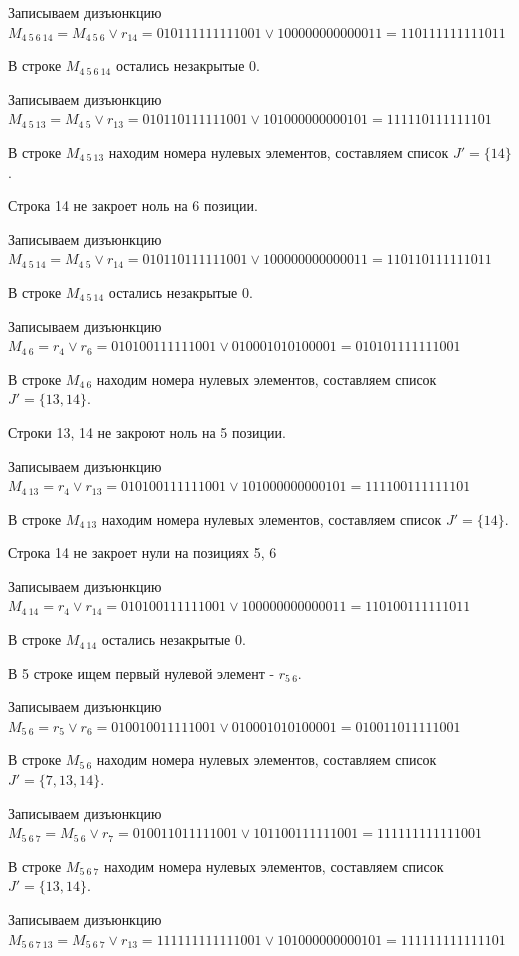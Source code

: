 \documentclass{article}
\begin{document}
Записываем дизъюнкцию $M_{4\ 5\ 6\ 14} = M_{4\ 5\ 6}\lor r_{14} = 010111111111001 \lor 100000000000011 = 110111111111011$

В строке $M_{4\ 5\ 6\ 14}$ остались незакрытые 0.

Записываем дизъюнкцию $M_{4\ 5\ 13} = M_{4\ 5}\lor r_{13} = 010110111111001 \lor 101000000000101 = 111110111111101$

В строке $M_{4\ 5\ 13}$ находим номера нулевых элементов, составляем список $J' = \{14\}$.

Строка 14 не закроет ноль на 6 позиции.

Записываем дизъюнкцию $M_{4\ 5\ 14} = M_{4\ 5}\lor r_{14} = 010110111111001 \lor 100000000000011 = 110110111111011$

В строке $M_{4\ 5\ 14}$ остались незакрытые 0.

Записываем дизъюнкцию $M_{4\ 6} = r_{4}\lor r_{6} = 010100111111001 \lor 010001010100001 = 010101111111001$

В строке $M_{4\ 6}$ находим номера нулевых элементов, составляем список $J' = \{13, 14\}$.

Строки 13, 14 не закроют ноль на 5 позиции.

Записываем дизъюнкцию $M_{4\ 13} = r_{4}\lor r_{13} = 010100111111001 \lor 101000000000101 = 111100111111101$

В строке $M_{4\ 13}$ находим номера нулевых элементов, составляем список $J' = \{14\}$.

Строка 14 не закроет нули на позициях 5, 6

Записываем дизъюнкцию $M_{4\ 14} = r_{4}\lor r_{14} = 010100111111001 \lor 100000000000011 = 110100111111011$

В строке $M_{4\ 14}$ остались незакрытые 0.



В 5 строке ищем первый нулевой элемент - $r_{5\ 6}$.

Записываем дизъюнкцию $M_{5\ 6} = r_{5}\lor r_{6} = 010010011111001 \lor 010001010100001 = 010011011111001$

В строке $M_{5\ 6}$ находим номера нулевых элементов, составляем список $J' = \{7, 13, 14\}$.

Записываем дизъюнкцию $M_{5\ 6\ 7} = M_{5\ 6}\lor r_{7} = 010011011111001 \lor 101100111111001 = 111111111111001$

В строке $M_{5\ 6\ 7}$ находим номера нулевых элементов, составляем список $J' = \{13, 14\}$.

Записываем дизъюнкцию $M_{5\ 6\ 7\ 13} = M_{5\ 6\ 7}\lor r_{13} = 111111111111001 \lor 101000000000101 = 111111111111101$
\end{document}
